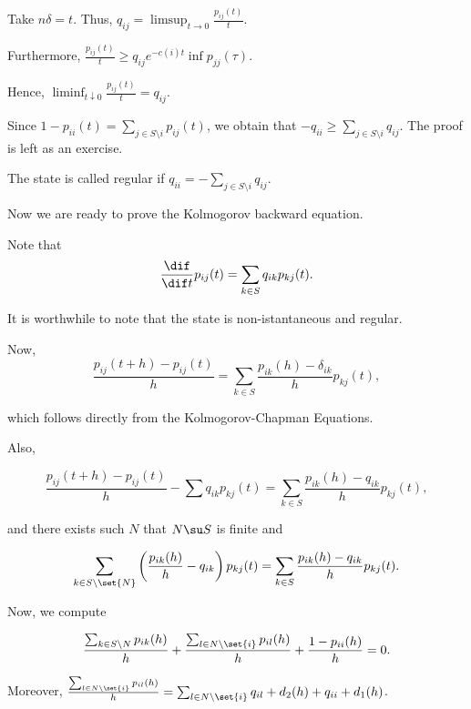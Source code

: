 \documentclass[11pt]{scrartcl}
\begin{document}
  Take $n\delta = t$. Thus, $q_{ij} = \limsup_{t\to 0} \frac{p_{ij}(t)}{t}$.

  Furthermore,
  $\frac{p_{ij}(t)}{t} \geq q_{ij}e^{-c(i)t}\inf p_{jj}(\tau)$.

  Hence, $\liminf_{t\downarrow 0} \frac{p_{ij}(t)}{t} = q_{ij}$.

  Since $1 - p_{ii}(t) = \sum_{j\in S\setminus i} p_{ij}(t)$, we obtain
  that $-q_{ii} \geq \sum_{j\in S\setminus i} q_{ij}$. The proof is left
  as an exercise.

  The state is called regular if
  $q_{ii} = - \sum_{j\in S\setminus i}q_{ij}$.

  Now we are ready to prove the  Kolmogorov backward equation.

  Note that
  \begin{equation*}
    \frac{\dif }{\dif t}p_{ij}(t) = \sum_{k\in S}q_{ik}p_{kj}(t).
  \end{equation*}

  It is worthwhile to note that the state is non-istantaneous and
  regular.

  Now,
  \begin{equation*}
    \frac{p_{ij}(t+h) - p_{ij}(t)}{h} =\sum_{k\in S} \frac{p_{ik}(h) - \delta_{ik}}{h} p_{kj}(t),
  \end{equation*}

  which follows directly from the Kolmogorov-Chapman Equations.

  Also,

  \begin{equation*}
    \frac{p_{ij}(t+h) - p_{ij}(t)}{h} - \sum q_{ik}p_{kj}(t) =\sum_{k\in S} \frac{p_{ik}(h) - q_{ik}}{h} p_{kj}(t),
  \end{equation*}

  and there exists such $N$ that $N \su S$ is finite and

  \begin{equation*}
    \sum_{k\in S\setminus \set{N}}\left(\frac{p_{ik}(h)}{h} - q_{ik}\right)p_{kj}(t) = \sum_{k\in S} \frac{p_{ik}(h) - q_{ik}}{h} p_{kj}(t).
  \end{equation*}

  Now, we compute

  \begin{equation*}
    \frac{\sum_{k\in S\setminus N} p_{ik}(h)}{h} + \frac{\sum_{l \in N\setminus \set{i}}p_{il}(h)}{h} + \frac{1-p_{ii}(h)}{h} = 0.
  \end{equation*}

  Moreover,
  $\frac{\sum_{l \in N\setminus \set{i}}p_{il}(h)}{h} = \sum_{l \in N
    \setminus \set{i}}q_{il} + d_{2}(h) + q_{ii} + d_{1}(h)$.
\end{document}
